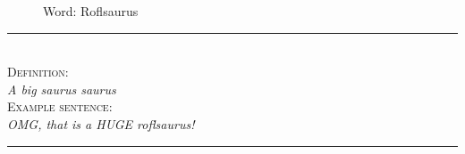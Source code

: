 \documentclass[12pt,a4paper,twoside]{report}
\begin{document}
\pagestyle{empty}

\mbox{}
\vfill
  \begin{figure}[H]
    \centering
 	Word: Roflsaurus
  \end{figure}
  \begin{center}
    \rule{15cm}{0.1cm} \\%
    \huge\textsc{Definition: }\\
    \large{\em{A big saurus saurus\\}}
    \huge\textsc{Example sentence: }\\
    \large{\em{OMG, that is a HUGE roflsaurus!}}
    \vspace{0.7cm}
    \rule{15cm}{0.1cm} \\[0.3cm]
    \vfill
    \normalsize

  \end{center}
\vfill
\mbox{}
\end{document}
